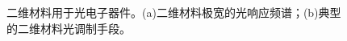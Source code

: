     \begin{figure}
        \caption{二维材料用于光电子器件。(a)二维材料极宽的光响应频谱；(b)典型的二维材料光调制手段。}
        \label{}
    \end{figure}


